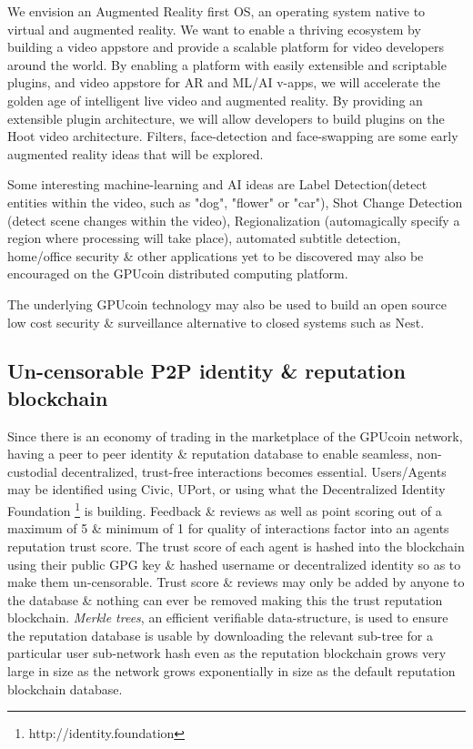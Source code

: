 \documentclass{article}
\begin{document}
We envision an Augmented Reality first OS, an operating system native to virtual and augmented reality. We want to enable a thriving ecosystem by building a video appstore and provide a scalable platform for video developers around the world. By enabling a platform with easily extensible and scriptable plugins, and video appstore for AR and ML/AI v-apps, we will accelerate the golden age of intelligent live video and augmented reality. By providing an extensible plugin architecture, we will allow developers to build plugins on the Hoot video architecture. Filters, face-detection and face-swapping are some early augmented reality ideas that will be explored.

Some interesting machine-learning and AI ideas are Label Detection(detect entities within the video, such as "dog", "flower" or "car"), Shot Change Detection (detect scene changes within the video), Regionalization (automagically specify a region where processing will take place), automated subtitle detection, home/office security \& other applications yet to be discovered may also be encouraged on the GPUcoin distributed computing platform.


The underlying GPUcoin technology may also be used to build an open source low cost security \& surveillance alternative to closed systems such as Nest.


\subsection{Un-censorable P2P identity \& reputation blockchain}
Since there is an economy of trading in the marketplace of the GPUcoin network, having a peer to peer identity \& reputation database to enable seamless, non-custodial decentralized, trust-free interactions becomes essential. Users/Agents may be identified using Civic, UPort, or using what the Decentralized Identity Foundation \footnote{http://identity.foundation} is building. Feedback \& reviews as well as point scoring out of a maximum of 5 \& minimum of 1 for quality of interactions factor into an agents reputation trust score. The trust score of each agent is hashed into the blockchain using their public GPG key \& hashed username or decentralized identity so as to make them un-censorable. Trust score \& reviews may only be added by anyone to the database \& nothing can ever be removed making this the trust reputation blockchain. \emph{Merkle trees}, an efficient verifiable data-structure, is used to ensure the reputation database is usable by downloading the relevant sub-tree for a particular user sub-network hash even as the reputation blockchain grows very large in size as the network grows exponentially in size as the default reputation blockchain database.
\end{document}
